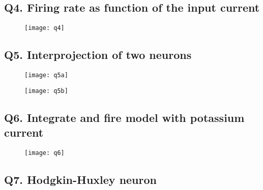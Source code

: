 \documentclass[DIV=calc, paper=a4, fontsize=11pt, twocolumn]{article}	 %
\begin{document}
	\subsection*{Q4. Firing rate as function of the input current}
		\begin{figure}[H]
			\texttt{[image: q4]}
		\end{figure}
	\subsection*{Q5. Interprojection of two neurons}
		\begin{figure}[H]
			\texttt{[image: q5a]}
		\end{figure}
		\begin{figure}[H]
			\texttt{[image: q5b]}
		\end{figure}
	\subsection*{Q6. Integrate and fire model with potassium current}
		\begin{figure}[H]
			\texttt{[image: q6]} 
		\end{figure}
	\subsection*{Q7. Hodgkin-Huxley neuron}
	
	
\end{document}
